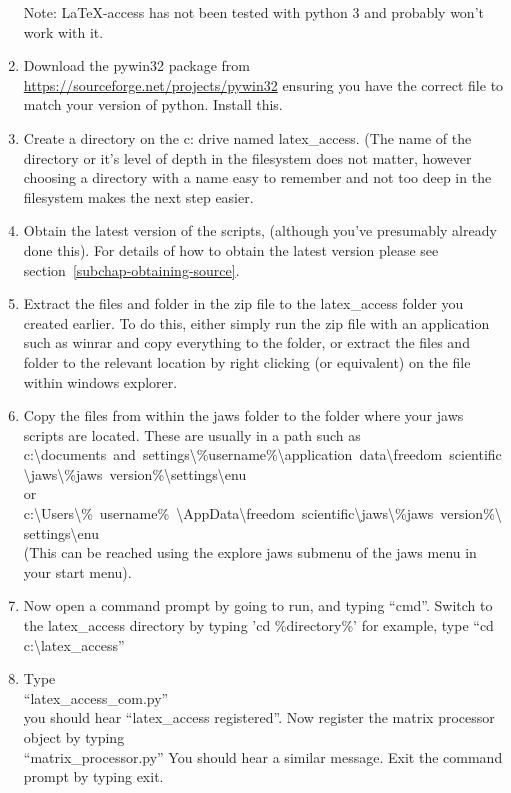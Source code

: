 \documentclass[12pt,a4paper]{report}
\begin{document}
\begin{enumerate}
Note: LaTeX-access has not been tested with python 3 and probably won't work with it.
\item Download the pywin32 package  from
\url{https://sourceforge.net/projects/pywin32} ensuring you have the correct
file to match your version of python. Install this.
\item Create a directory on the c: drive named latex\_access. (The name
of the directory or it's level of depth in the filesystem does not
matter, however choosing a directory with a name easy to remember and
not too deep in the filesystem makes the next step easier.
\item Obtain the latest version of the scripts, (although you've
presumably already done this).  For details of how to obtain the
latest version please see section~\ref{subchap-obtaining-source}.
\item Extract the files and folder in the zip file to the latex\_access
folder you created earlier. To do this, either simply run the zip file
with an application such as winrar and copy everything to the folder,
or extract the files and folder to the relevant location by right
clicking (or equivalent) on the file within windows explorer.
\item Copy the files from within the jaws folder to the folder where your
jaws scripts are located. These are usually in a path such as\\
\mbox{c:\textbackslash documents and settings\textbackslash\%username\%\textbackslash application data\textbackslash freedom scientific\textbackslash jaws\textbackslash\%jaws version\%\textbackslash settings\textbackslash enu}\\
or\\
\mbox{c:\textbackslash Users\textbackslash \% username\% \textbackslash AppData\textbackslash freedom scientific\textbackslash jaws\textbackslash\%jaws version\%\textbackslash settings\textbackslash enu}\\
(This can be reached using the explore jaws submenu of the jaws menu
in your start menu).
\item Now open a command prompt by going to run, and typing ``cmd''.
Switch to the latex\_access directory by typing 'cd \%directory\%' for
example, type ``cd c:\textbackslash latex\_access''
\item Type\\
``latex\_access\_com.py''\\
you should hear ``latex\_access registered''.  Now
register the matrix processor object by typing\\
``matrix\_processor.py''
You should hear a similar message.  Exit the command
prompt by typing exit.


\end{enumerate}
\end{document}

